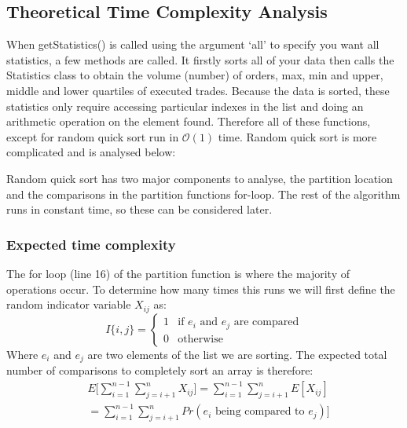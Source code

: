 \documentclass[11p]{article}
\begin{document}
\subsection{Theoretical Time Complexity Analysis}
When getStatistics() is called using the argument `all' to specify you want all statistics, a few methods are called. It firstly sorts all of your data then calls the Statistics class to obtain the volume (number) of orders, max, min and upper, middle and lower quartiles of executed trades. Because the data is sorted, these statistics only require accessing particular indexes in the list and doing an arithmetic operation on the element found. Therefore all of these functions, except for random quick sort run in $\mathcal{O}(1)$ time. Random quick sort is more complicated and is analysed below:



Random quick sort has two major components to analyse, the partition location and the comparisons in the partition functions for-loop. The rest of the algorithm runs in constant time, so these can be considered later. 
\subsubsection{Expected time complexity}
The for loop (line 16) of the partition function is where the majority of operations occur. To determine how many times this runs we will first define the random indicator variable $X_{ij}$ as:
\begin{equation*}
    I\{i,j \}=
    \begin{cases}
    1 & \text{if } e_i \text{ and } e_j \text{ are compared} \\
    0 &  \text{otherwise}
    \end{cases}
    \end{equation*}
Where $e_i$ and $e_j$ are two elements of the list we are sorting. The expected total number of comparisons to completely sort an array is therefore:
\begin{align*}
    &E\big[\sum_{i=1}^{n-1} \sum_{j = i+1}^{n} X_{ij}\big] = \sum_{i=1}^{n-1} \sum_{j = i+1}^{n} E[X_{ij}] \\
    &= \sum_{i=1}^{n-1} \sum_{j = i+1}^{n} Pr(e_i \text{ being compared to } e_j)]
\end{align*}
\end{document}
